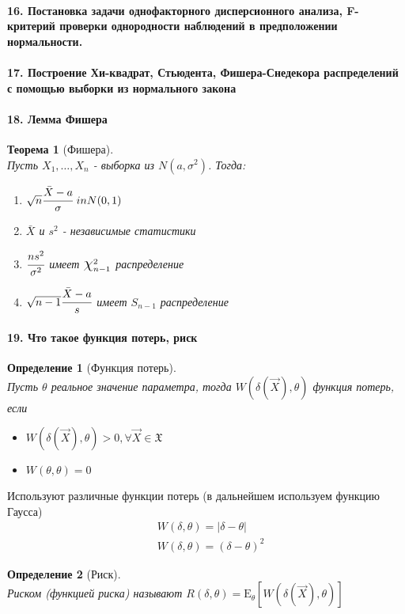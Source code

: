 \documentclass[titlepage]{article}
\newcommand{\sX}{\mathfrak{X}}
\newcommand{\sE}{\mathrm{E}}
\newcommand*{\bigchi}{\mbox{\Large$\chi$}} %
\newtheorem{theorem}{Теорема}
\newtheorem{definition}{Определение}
\begin{document}
\paragraph{16. Постановка задачи однофакторного дисперсионного анализа, F-критерий проверки однородности наблюдений в предположении нормальности.}

\paragraph{17. Построение Хи-квадрат, Стьюдента, Фишера-Снедекора распределений с помощью выборки из нормального закона}

\paragraph{18. Лемма Фишера}
\begin{theorem}[Фишера] ~\\
	Пусть $X_1,\dots,X_n$ - выборка из $N(a,\sigma^2)$. Тогда:
	\begin{enumerate}
		\item $\sqrt{n}\cfrac{\bar X - a}{\sigma} \ in N(0,1)$
		\item $\bar X$ и $s^2$ - независимые статистики
		\item $\cfrac{ns^2}{\sigma^2}$ имеет $\bigchi^2_{n-1}$ распределение
		\item $\sqrt{n-1}\cfrac{\bar X - a}{s}$ имеет $S_{n-1}$ распределение
	\end{enumerate}
\end{theorem}

\paragraph{19. Что такое функция потерь, риск}
\begin{definition}[Функция потерь] ~\\
	Пусть $\theta$ реальное значение параметра, тогда $W(\delta (\vec{X}),\theta)$ функция потерь, если
	\begin{itemize}
	 	\item $W(\delta (\vec{X}),\theta)>0,\forall \vec{X} \in \sX$
	 	\item $W(\theta,\theta)=0$
	 \end{itemize} 
\end{definition}
Используют различные функции потерь (в дальнейшем используем функцию Гаусса)
\begin{align}
	& W(\delta,\theta)=|\delta-\theta| \tag{Лаплас} \\
	& W(\delta,\theta)=(\delta-\theta)^2 \tag{Гаусс}
\end{align}
\begin{definition}[Риск]~\\
	Риском (функцией риска) называют $R(\delta,\theta) = \sE_\theta[W(\delta(\vec{X}),\theta)]$
\end{definition}
\end{document}
